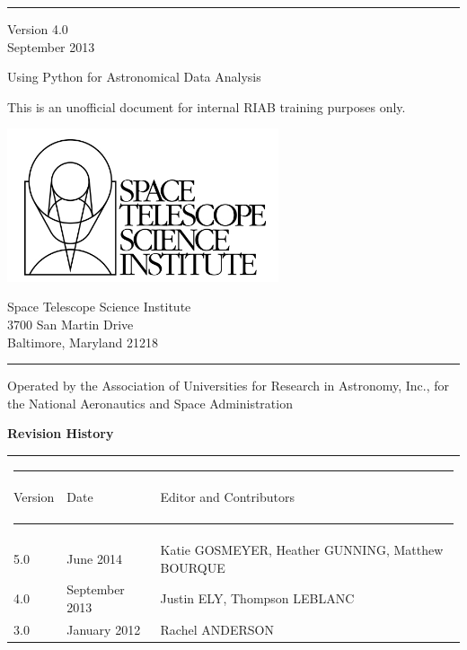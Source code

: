 \begin{titlepage}
\rule{165mm}{0.8mm}
 Version 4.0 \\
 September 2013

\vspace{30mm}
{\Huge Using Python for Astronomical Data Analysis }

\vspace{10mm}
{\large This is an unofficial document for internal RIAB training purposes only.}
\vspace{65mm}

\begin{minipage}[l]{80mm}
\includegraphics[width=8cm]{logo.jpg}

\end{minipage}
%
\hspace{5mm}
\begin{minipage}[u]{75mm}
\begin{flushright}
Space Telescope Science Institute \\
3700 San Martin Drive \\
Baltimore, Maryland 21218
\end{flushright}
\end{minipage}

\rule{165mm}{0.8mm}

{\scriptsize Operated by the Association of Universities for Research in Astronomy, Inc., for the National Aeronautics and Space Administration }
 
 \newpage
  \thispagestyle{empty}  
  
{\Large \bf Revision History}



\begin{table}[h]
\begin{tabular}{lll} 
\multicolumn{3}{c}{ \rule{130mm}{0.2mm}}      \\
Version  & Date & Editor and Contributors    {\rule [-3mm]{0mm}{8mm}  }\\ 
 \multicolumn{3}{c}{ \rule[2mm]{130mm}{0.8mm}}      \\
      5.0                 &  June 2014 & Katie GOSMEYER, Heather GUNNING, Matthew BOURQUE \\
      4.0                 &  September 2013 & Justin ELY, Thompson LEBLANC \\
      3.0                 &  January 2012  & Rachel ANDERSON  \\ 
 

\end{tabular}
\end{table}
\end{titlepage}
